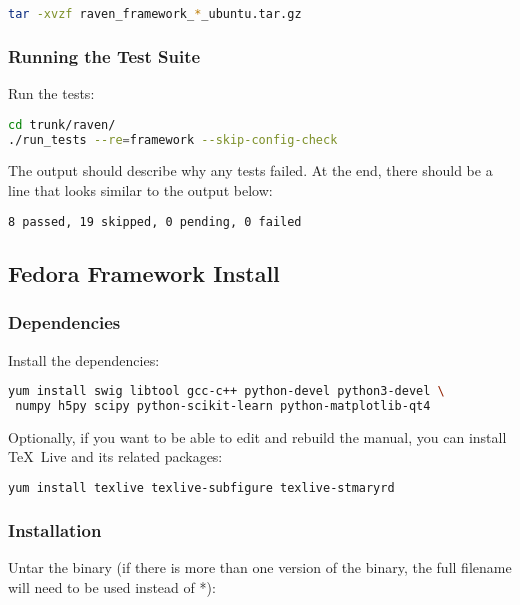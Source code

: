 \begin{lstlisting}[language=bash]
tar -xvzf raven_framework_*_ubuntu.tar.gz
\end{lstlisting}

\subsubsection{Running the Test Suite}
Run the tests:

\begin{lstlisting}[language=bash]
cd trunk/raven/
./run_tests --re=framework --skip-config-check
\end{lstlisting}

The output should describe why any tests failed.
%
At the end, there should be a line that looks similar to the output below:
\begin{lstlisting}[language=bash]
8 passed, 19 skipped, 0 pending, 0 failed
\end{lstlisting}

\subsection{Fedora Framework Install}

\subsubsection{Dependencies}
Install the dependencies:

\begin{lstlisting}[language=bash]
yum install swig libtool gcc-c++ python-devel python3-devel \
 numpy h5py scipy python-scikit-learn python-matplotlib-qt4
\end{lstlisting}


Optionally, if you want to be able to edit and rebuild the manual, you can 
install \TeX~Live and its related packages:
\begin{lstlisting}[language=bash]
yum install texlive texlive-subfigure texlive-stmaryrd
\end{lstlisting}

\subsubsection{Installation}
Untar the binary (if there is more than one version of the
binary, the full filename will need to be used instead of *):

